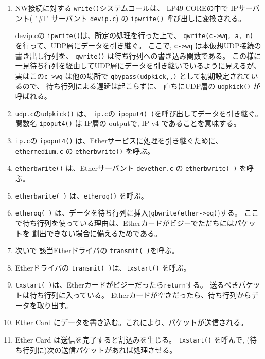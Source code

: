 \begin{enumerate}
\item   NW接続に対する {\tt write()}システムコールは、
        LP49-COREの中で IPサーバント( "\#I" サーバント {\tt devip.c}) の
        \verb|ipwrite()| 呼び出しに変換される。

        devip.cの \verb|ipwrite()|は、所定の処理を行った上で、
        \verb|qwrite(c->wq, a, n)| を行って、UDP層にデータを引き継ぐ。
       ここで, \verb|c->wq| は本仮想UDP接続の書き出し行列を、
       \verb|qwrite()| は待ち行列への書き込み関数である。
       この様に一見待ち行列を経由してUDP層にデータを引き継いでいるように見えるが、
       実はこの\verb|c->wq| は他の場所で 
       \verb|qbypass(udpkick,,)| として初期設定されているので、
       待ち行列による遅延は起こらずに、
       直ちにUDP層の \verb|udpkick()| が呼ばれる。

\item  {\tt udp.c}の\verb|udpkick()| は、
       {\tt ip.c}の \verb|ipoput4( )|を呼び出してデータを引き継ぐ。
       関数名 {\tt ipoput4()} は IP層の outputで, IP-v4 であることを意味する。

\item  {\tt ip.c}の \verb|ipoput4()| は、Etherサービスに処理を引き継ぐために、
        {\tt ethermedium.c} の \verb|etherbwrite()| を呼ぶ。

\item  \verb|etherbwrite()| は、Etherサーバント {\tt devether.c} の
        \verb|etherbwrite( )| を呼ぶ。

\item    \verb|etherbwrite( )| は、\verb|etheroq()| を呼ぶ。

\item    \verb|etheroq( )| は、データを待ち行列に挿入(\verb|qbwrite(ether->oq)|)する。
        ここで待ち行列を使っている理由は、Etherカードがビジーでただちにはパケットを
        創出できない場合に備えるためである。

\item    次いで 該当Etherドライバの \verb|transmit( )|を呼ぶ。

\item    Etherドライバの \verb|transmit( )|は、\verb|txstart()| を呼ぶ。

\item    \verb|txstart( )|は、Etherカードがビジーだったら{\tt return}する。
         送るべきパケットは待ち行列に入っている。
         Etherカードが空きだったら、待ち行列からデータを取り出す。

\item   Ether Card にデータを書き込む。これにより、パケットが送信される。

\item   Ether Card は送信を完了すると割込みを生じる。
        \verb|txstart()| を呼んで, (待ち行列に)次の送信パケットがあれば処理させる。

\end{enumerate}

